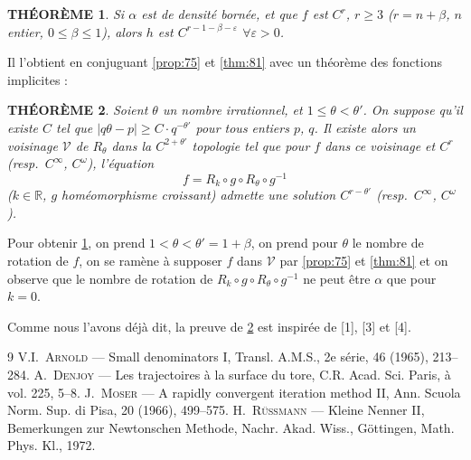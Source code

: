 \documentclass[12pt]{amsart}
\theoremstyle{plain}
\newtheorem{theoreme}{TH\'{E}OR\`{E}ME}[section]
\theoremstyle{remark}
\begin{document}
\begin{theoreme}\label{thm:91}
Si $\alpha$ est de densit\'{e} born\'{e}e, et que $f$ est $C^{r}$, $r \geq 3$ ($r = n + \beta$, $n$ entier, $0 \leq \beta \leq 1$), alors $h$ est $C^{r-1-\beta-\varepsilon}$ $\forall \varepsilon > 0$.
\end{theoreme}

Il l'obtient en conjuguant \ref{prop:75} et \ref{thm:81} avec un th\'{e}or\`{e}me des fonctions implicites :

\begin{theoreme}\label{thm:92}
Soient $\theta$ un nombre irrationnel, et $1 \leq \theta < \theta'$. On suppose qu'il existe $C$ tel que $|q\theta - p| \geq C \cdot q^{-\theta'}$ pour tous entiers $p$, $q$. Il existe alors un voisinage $\mathcal{V}$ de $R_{\theta}$ dans la $C^{2+\theta'}$ topologie tel que pour $f$ dans ce voisinage et $C^{r}$ (resp.~$C^{\infty}$, $C^{\omega}$), l'\'{e}quation
\[
f = R_{k} \circ g \circ R_{\theta} \circ g^{-1}
\]
($k \in \mathbb{R}$, $g$ hom\'{e}omorphisme croissant) admette une solution $C^{r-\theta'}$ (resp.~$C^{\infty}$, $C^{\omega}$).
\end{theoreme}

Pour obtenir \ref{thm:91}, on prend $1 < \theta < \theta' = 1 + \beta$, on prend pour $\theta$ le nombre de rotation de $f$, on se ram\`{e}ne \`{a} supposer $f$ dans $\mathcal{V}$ par \ref{prop:75} et \ref{thm:81} et on observe que le nombre de rotation de $R_{k} \circ g \circ R_{\theta} \circ g^{-1}$ ne peut \^{e}tre $\alpha$ que pour $k = 0$.

Comme nous l'avons d\'{e}j\`{a} dit, la preuve de \ref{thm:92} est inspir\'{e}e de [1], [3] et [4].

\begin{thebibliography}{9}
 V.I.~\textsc{Arnold} --- Small denominators I, Transl. A.M.S., 2e s\'{e}rie, 46 (1965), 213--284.
 A.~\textsc{Denjoy} --- Les trajectoires \`{a} la surface du tore, C.R. Acad. Sci. Paris, \`{a} vol. 225, 5--8.
 J.~\textsc{Moser} --- A rapidly convergent iteration method II, Ann. Scuola Norm. Sup. di Pisa, 20 (1966), 499--575.
 H.~\textsc{R\"{u}ssmann} --- Kleine Nenner II, Bemerkungen zur Newtonschen Methode, Nachr. Akad. Wiss., G\"{o}ttingen, Math. Phys. Kl., 1972.
\end{thebibliography}
\end{document}
